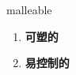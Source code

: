 
\begin{frame}
{\huge malleable}
\begin{center}
\begin{enumerate}\Large
  \item \textbf{可塑的}
  \item \textbf{易控制的}
\end{enumerate}
\end{center}
\end{frame}
